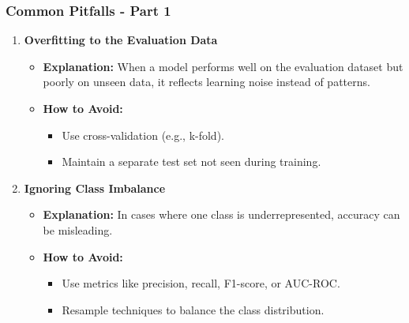 \documentclass[aspectratio=169]{beamer}
\begin{document}
\begin{frame}[fragile]
    \frametitle{Common Pitfalls - Part 1}
    \begin{enumerate}
        \item \textbf{Overfitting to the Evaluation Data}
        \begin{itemize}
            \item \textbf{Explanation:} When a model performs well on the evaluation dataset but poorly on unseen data, it reflects learning noise instead of patterns.
            \item \textbf{How to Avoid:} 
            \begin{itemize}
                \item Use cross-validation (e.g., k-fold).
                \item Maintain a separate test set not seen during training.
            \end{itemize}
        \end{itemize}

        \item \textbf{Ignoring Class Imbalance}
        \begin{itemize}
            \item \textbf{Explanation:} In cases where one class is underrepresented, accuracy can be misleading.
            \item \textbf{How to Avoid:}
            \begin{itemize}
                \item Use metrics like precision, recall, F1-score, or AUC-ROC.
                \item Resample techniques to balance the class distribution.
            \end{itemize}
        \end{itemize}
    \end{enumerate}
\end{frame}
\end{document}
